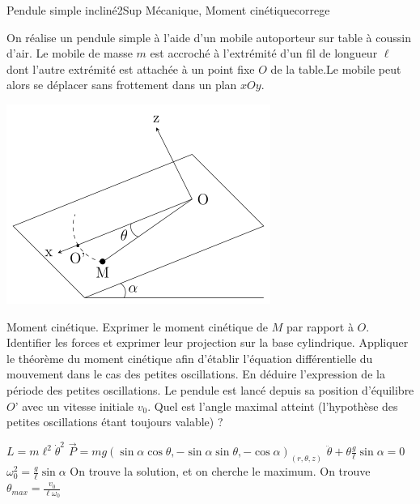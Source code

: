 \begin{exercise}{Pendule simple incliné}{2}{Sup}
{Mécanique, Moment cinétique}{correge}

On réalise un pendule simple à l’aide d’un mobile autoporteur sur table à coussin d’air. Le mobile de masse $m$ est accroché à l’extrémité d’un fil de longueur $\ell$ dont l’autre extrémité est attachée à un point fixe $O$ de la table.Le mobile peut alors se déplacer sans frottement dans un plan $xOy$.

\begin{center}
    \includegraphics[scale=0.6]{meca/mecasolides/pendule_incline}
\end{center}

\begin{questions}
    \questioncours Moment cinétique.
    \question Exprimer le moment cinétique de $M$ par rapport à $O$.
    \question Identifier les forces et exprimer leur projection sur la base cylindrique.
    \question Appliquer le théorème du moment cinétique afin d’établir l’équation différentielle du mouvement dans le cas des petites oscillations.
    \question En déduire l’expression de la période des petites oscillations.
    \question Le pendule est lancé depuis sa position d’équilibre $O$’ avec un vitesse initiale $v_0$. Quel est l’angle maximal atteint (l’hypothèse des petites oscillations étant toujours valable) ?
\end{questions}

\end{exercise}

\begin{solution}
\begin{questions}
    \questioncours 
    \question $L = m\ell^2 \dot{\theta}^2$
    \question $\vec{P} = mg(\sin \alpha \cos \theta, -\sin \alpha \sin \theta,  -\cos \alpha)_{(r,\theta,z)}$
    \question $\ddot \theta + \theta \frac{g}{\ell}\sin \alpha = 0$
    \question $\omega_0^2 = \frac{g}{\ell}\sin \alpha$
    \question On trouve la solution, et on cherche le maximum. On trouve $\theta_{max} = \frac{v_0}{\ell \omega_0}$
\end{questions}

\end{solution}

